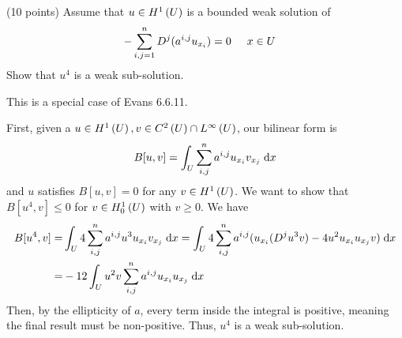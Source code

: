 (10 points)
Assume that $u \in H^{1}\left(U \right)$ is a bounded weak solution of
\begin{align*}
  -\sum_{i, j = 1}^n D^{j} (a^{i, j} u_{x_i}) = 0
    & \hspace{5mm} x \in U
\end{align*}
Show that $u^4$ is a weak sub-solution.

This is a special case of Evans 6.6.11.

First, given a $u \in H^{1}\left(U \right), v \in C^{2}\left(U \right) \cap L^{\infty}\left(U \right)$, our bilinear form is
\begin{align*}
  B[u, v] = \int_{U} \sum_{i, j}^n a^{i, j} u_{x_i} v_{x_j} \;\mathrm{d}x
\end{align*}
and $u$ satisfies $B[u, v] = 0$ for any $v \in H^{1}\left(U \right)$.
We want to show that $B[u^4, v] \leq 0$ for $v \in H_0^{1}\left(U \right)$ with $v \geq 0$.
We have
\begin{align*}
  B[u^4, v] = &\int_{U} 4 \sum_{i, j}^n a^{i, j} u^3 u_{x_i} v_{x_j} \;\mathrm{d}x
    = \int_{U} 4 \sum_{i, j}^n a^{i, j} (u_{x_i} (D^{j} u^3 v) - 4 u^2 u_{x_i} u_{x_j} v) \;\mathrm{d}x\\
    = &-12 \int_{U} u^2 v \sum_{i, j}^n a^{i, j} u_{x_i} u_{x_j} \;\mathrm{d}x
\end{align*}
Then, by the ellipticity of $a$, every term inside the integral is positive, meaning the final result must be non-positive.
Thus, $u^4$ is a weak sub-solution.
\newpage
